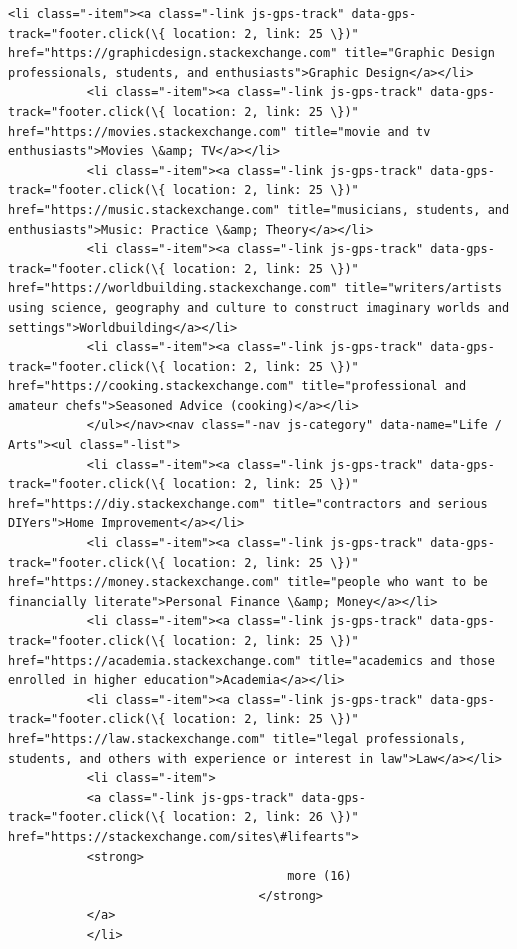 \documentclass[11pt]{article}
\begin{document}
\begin{Verbatim}[commandchars=\\\{\}]
           <li class="-item"><a class="-link js-gps-track" data-gps-track="footer.click(\{ location: 2, link: 25 \})" href="https://graphicdesign.stackexchange.com" title="Graphic Design professionals, students, and enthusiasts">Graphic Design</a></li>
           <li class="-item"><a class="-link js-gps-track" data-gps-track="footer.click(\{ location: 2, link: 25 \})" href="https://movies.stackexchange.com" title="movie and tv enthusiasts">Movies \&amp; TV</a></li>
           <li class="-item"><a class="-link js-gps-track" data-gps-track="footer.click(\{ location: 2, link: 25 \})" href="https://music.stackexchange.com" title="musicians, students, and enthusiasts">Music: Practice \&amp; Theory</a></li>
           <li class="-item"><a class="-link js-gps-track" data-gps-track="footer.click(\{ location: 2, link: 25 \})" href="https://worldbuilding.stackexchange.com" title="writers/artists using science, geography and culture to construct imaginary worlds and settings">Worldbuilding</a></li>
           <li class="-item"><a class="-link js-gps-track" data-gps-track="footer.click(\{ location: 2, link: 25 \})" href="https://cooking.stackexchange.com" title="professional and amateur chefs">Seasoned Advice (cooking)</a></li>
           </ul></nav><nav class="-nav js-category" data-name="Life / Arts"><ul class="-list">
           <li class="-item"><a class="-link js-gps-track" data-gps-track="footer.click(\{ location: 2, link: 25 \})" href="https://diy.stackexchange.com" title="contractors and serious DIYers">Home Improvement</a></li>
           <li class="-item"><a class="-link js-gps-track" data-gps-track="footer.click(\{ location: 2, link: 25 \})" href="https://money.stackexchange.com" title="people who want to be financially literate">Personal Finance \&amp; Money</a></li>
           <li class="-item"><a class="-link js-gps-track" data-gps-track="footer.click(\{ location: 2, link: 25 \})" href="https://academia.stackexchange.com" title="academics and those enrolled in higher education">Academia</a></li>
           <li class="-item"><a class="-link js-gps-track" data-gps-track="footer.click(\{ location: 2, link: 25 \})" href="https://law.stackexchange.com" title="legal professionals, students, and others with experience or interest in law">Law</a></li>
           <li class="-item">
           <a class="-link js-gps-track" data-gps-track="footer.click(\{ location: 2, link: 26 \})" href="https://stackexchange.com/sites\#lifearts">
           <strong>
                                       more (16)
                                   </strong>
           </a>
           </li>

\end{Verbatim}
\end{document}
